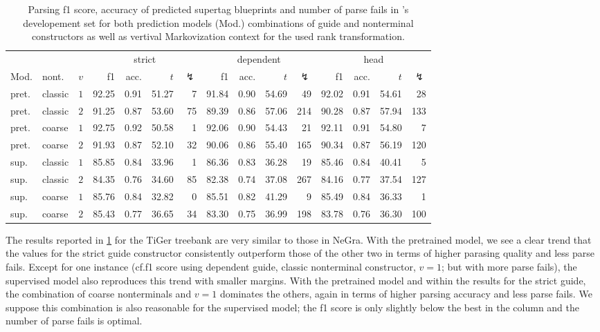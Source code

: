 \documentclass[../../document.tex]{subfiles}
\begin{document}
    \begin{table}
        \caption{\label{tbl:experiments:tiger}
        Parsing f1 score, accuracy of predicted supertag blueprints and number of parse fails in 's developement set for both prediction models (Mod.) combinations of guide and nonterminal constructors as well as vertival Markovization context for the used rank transformation.
        }
        \centering
        \setlength{\tabcolsep}{4pt}
        \vspace{.2cm}
        \begin{tabular}{llc|rrrr|rrrr|rrrr}
            \toprule
         &    &        & \multicolumn{4}{c|}{strict} & \multicolumn{4}{c|}{dependent} & \multicolumn{4}{c}{head}  \\
    Mod. & nont.   &\(v\)   & f1 & acc. & $t$ & $\lightning$ & f1 & acc. & $t$ & $\lightning$ & f1 & acc. & $t$ & $\lightning$ \\ \hline
    pret. & classic & \(1\)  & 92.25 & 0.91 & 51.27 & 7 & 91.84 & 0.90 & 54.69 & 49 & 92.02 & 0.91 & 54.61 & 28 \\
    pret. & classic & \(2\)  & 91.25 & 0.87 & 53.60 & 75 & 89.39 & 0.86 & 57.06 & 214 & 90.28 & 0.87 & 57.94 & 133 \\
    pret. & coarse  & \(1\)  & 92.75 & 0.92 & 50.58 & 1 & 92.06 & 0.90 & 54.43 & 21 & 92.11 & 0.91 & 54.80 & 7 \\
    pret. & coarse  & \(2\)  & 91.93 & 0.87 & 52.10 & 32 & 90.06 & 0.86 & 55.40 & 165 & 90.34 & 0.87 & 56.19 & 120 \\
    \midrule
    sup. & classic & \(1\)  & 85.85 & 0.84 & 33.96 & 1 & 86.36 & 0.83 & 36.28 & 19 & 85.46 & 0.84 & 40.41 & 5 \\
    sup. & classic & \(2\)  & 84.35 & 0.76 & 34.60 & 85 & 82.38 & 0.74 & 37.08 & 267 & 84.16 & 0.77 & 37.54 & 127 \\
    sup. & coarse  & \(1\)  & 85.76 & 0.84 & 32.82 & 0 & 85.51 & 0.82 & 41.29 & 9 & 85.49 & 0.84 & 36.33 & 1 \\
    sup. & coarse  & \(2\)  & 85.43 & 0.77 & 36.65 & 34 & 83.30 & 0.75 & 36.99 & 198 & 83.78 & 0.76 & 36.30 & 100 \\
    \bottomrule
        \end{tabular}
    \end{table}

    The results reported in \cref{tbl:experiments:tiger} for the TiGer treebank are very similar to those in NeGra.
    With the pretrained model, we see a clear trend that the values for the strict guide constructor consistently outperform those of the other two in terms of higher parasing quality and less parse fails.
    Except for one instance (cf.\@ f1 score using dependent guide, classic nonterminal constructor, $v=1$; but with more parse fails), the supervised model also reproduces this trend with smaller margins.
    With the pretrained model and within the results for the strict guide, the combination of coarse nonterminals and $v=1$ dominates the others, again in terms of higher parsing accuracy and less parse fails.
    We suppose this combination is also reasonable for the supervised model; the f1 score is only slightly below the best in the column and the number of parse fails is optimal.
\end{document}
